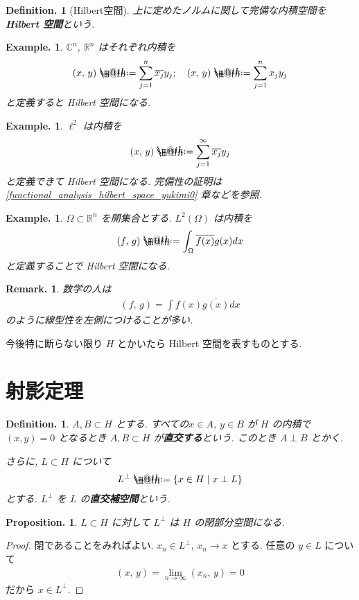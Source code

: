 \documentclass[openany, a4paper, oneside]{jsbook}
\makeatletter
\newcommand*{\defeq}{\mathrel{\rlap{%
\raisebox{0.3ex}{$\m@th\cdot$}}%
\raisebox{-0.3ex}{$\m@th\cdot$}}%
=}
\theoremstyle{break}
\theoremstyle{breakdefn}
\newtheorem{prop}[thm]{Proposition.}
\newtheorem{defn}[thm]{Definition.}
\newtheorem{ex}[thm]{Example.}
\newtheorem{rem}[thm]{Remark.}
\newcommand{\rbkt}[2]{\left ( #1,\,#2 \right)}
\newcommand{\relmiddle}[1]{\mathrel{}\middle#1\mathrel{}}
\newcommand{\set}[2]{\left\{#1 \relmiddle| #2\right\}}
\newcommand{\bbC}{\mathbb{C}}
\newcommand{\bbR}{\mathbb{R}}
\newcommand{\bbRn}{\mathbb{R}^n}
\makeatother
\begin{document}
\begin{defn}[Hilbert空間]
上に定めたノルムに関して完備な内積空間を\textbf{Hilbert 空間}という.
\end{defn}
\begin{ex}
$\bbC^n$, $\bbR^n$ はそれぞれ内積を
\begin{align}
 \rbkt{x}{y}
 \defeq
 \sum_{j=1}^n \overline{x_j} y_j ; \quad
 \rbkt{x}{y}
 \defeq
 \sum_{j=1}^n x_j y_j
\end{align}
と定義すると Hilbert 空間になる.
\end{ex}
\begin{ex}
$\ell^2$ は内積を
\begin{align}
 \rbkt{x}{y}
 \defeq
 \sum_{j=1}^{\infty} \overline{x_j} y_j
\end{align}
と定義できて Hilbert 空間になる.
完備性の証明は \ref{functional_analysis_hilbert_space_yukimi0} 章などを参照.
\end{ex}
\begin{ex}
$\Omega \subset \bbRn$ を開集合とする.
$L^2(\Omega)$ は内積を
\begin{align}
 \rbkt{f}{g}
 \defeq
 \int_{\Omega} \overline{f(x)} g(x) dx
\end{align}
と定義することで Hilbert 空間になる.
\end{ex}
\begin{rem}
数学の人は
\begin{align}
 \rbkt{f}{g}
 =
 \int f(x) \overline{g(x)} dx
\end{align}
のように線型性を左側につけることが多い.
\end{rem}

今後特に断らない限り $H$ とかいたら Hilbert 空間を表すものとする.
\section{射影定理}


\begin{defn}
 $A, B \subset H$ とする.
 すべての$x \in A$, $y \in B$ が $H$ の内積で $(x, y) = 0$ となるとき
 $A, B \subset H$ が\textbf{直交する}という.
 このとき $A \perp B$ とかく.

 さらに,
 $L \subset H$ について
 \begin{align}
  L^{\perp}
  \defeq
  \set{x \in H}{x \perp L}
 \end{align}
 とする.
 $L^{\perp}$ を $L$ の\textbf{直交補空間}という.
\end{defn}

\begin{prop}
 $L \subset H$ に対して $L^{\perp}$ は $H$ の閉部分空間になる.
\end{prop}
\begin{proof}
閉であることをみればよい.
$x_n \in L^{\perp}$, $x_n \to x$ とする.
任意の $y \in L$ について
\begin{align}
 \rbkt{x}{y}
 =
 \lim_{n \to \infty} \rbkt{x_n}{y}
 =
 0
\end{align}
だから $x \in L^{\perp}$.
\end{proof}
\end{document}
